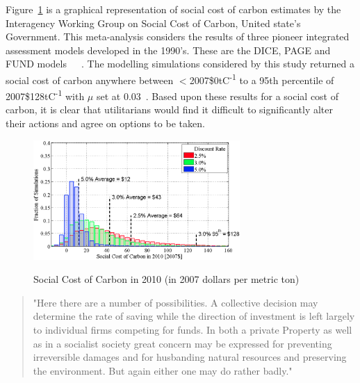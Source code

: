 \documentclass[11pt, oneside]{article}   	%
\begin{document}
Figure~\ref{USA SCC figure} is a graphical representation of social cost of carbon estimates by the Interagency Working Group on Social Cost of Carbon, United state's Government. This meta-analysis considers the results of three pioneer integrated assessment models developed in the 1990's. These are the DICE, PAGE and FUND models~\cite{wn1}~\cite{ch1}~\cite{rsjt1}. The modelling simulations considered by this study returned a social cost of carbon anywhere between $<$2007\$0tC\textsuperscript{-1} to a 95th percentile of 2007\$128tC\textsuperscript{-1} with $\mu$ set at 0.03~\cite{iwg1}. Based upon these results for a social cost of carbon, it is clear that utilitarians would find it difficult to significantly alter their actions and agree on options to be taken. 

\begin{figure}[H]
\caption{Social Cost of Carbon in 2010 (in 2007 dollars per metric ton)}
\centering
\includegraphics[width=0.7\textwidth]{scc}
\label{USA SCC figure}
\end{figure}

\pagebreak

\begin{quote}
"Here there are a number of possibilities. A collective decision may determine the rate of saving while the direction of investment is left largely to individual firms competing for funds. In both a private Property as well as in a socialist society great concern may be expressed for preventing irreversible damages and for husbanding natural resources and preserving the environment. But again either one may do rather badly."~\cite{jr1}
\end{quote}
\end{document}
